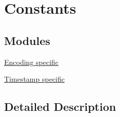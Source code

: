 \hypertarget{group__lavu__const}{}\section{Constants}
\label{group__lavu__const}
\subsection*{Modules}
\begin{DoxyCompactItemize}
\item 
\hyperlink{group__lavu__enc}{Encoding specific}
\item 
\hyperlink{group__lavu__time}{Timestamp specific}
\end{DoxyCompactItemize}


\subsection{Detailed Description}
